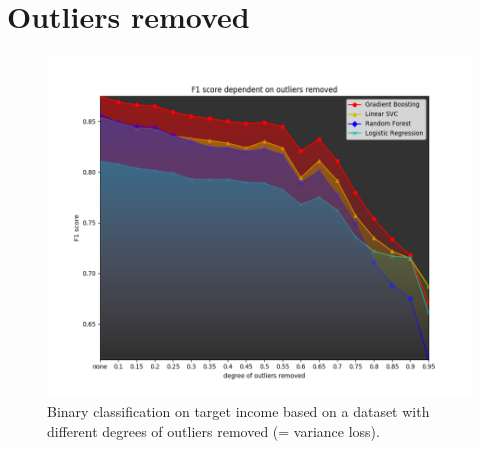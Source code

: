\documentclass{llncs}
\begin{document}


\section{Outliers removed}

\begin{figure}[!h]
	\centering
	\includegraphics[width=1\textwidth]{figures/outliers/outliers_removed_all_algos_blur_scaled}
	\caption{Binary classification on target income based on a dataset with different degrees of outliers removed (= variance loss).}
	\label{fig:results_outliers_removed}
\end{figure}
\end{document}
